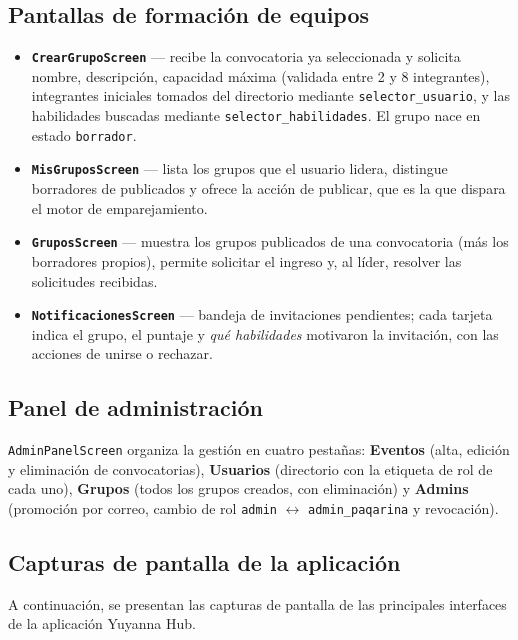 \documentclass[12pt,a4paper]{article}
\begin{document}
\subsection{Pantallas de formación de equipos}
\begin{itemize}
    \item \textbf{\texttt{CrearGrupoScreen}} --- recibe la convocatoria ya seleccionada y solicita nombre, descripción, capacidad máxima (validada entre 2 y 8 integrantes), integrantes iniciales tomados del directorio mediante \texttt{selector\_usuario}, y las habilidades buscadas mediante \texttt{selector\_habilidades}. El grupo nace en estado \texttt{borrador}.
    \item \textbf{\texttt{MisGruposScreen}} --- lista los grupos que el usuario lidera, distingue borradores de publicados y ofrece la acción de publicar, que es la que dispara el motor de emparejamiento.
    \item \textbf{\texttt{GruposScreen}} --- muestra los grupos publicados de una convocatoria (más los borradores propios), permite solicitar el ingreso y, al líder, resolver las solicitudes recibidas.
    \item \textbf{\texttt{NotificacionesScreen}} --- bandeja de invitaciones pendientes; cada tarjeta indica el grupo, el puntaje y \emph{qué habilidades} motivaron la invitación, con las acciones de unirse o rechazar.
\end{itemize}

\subsection{Panel de administración}
\texttt{AdminPanelScreen} organiza la gestión en cuatro pestañas: \textbf{Eventos} (alta, edición y eliminación de convocatorias), \textbf{Usuarios} (directorio con la etiqueta de rol de cada uno), \textbf{Grupos} (todos los grupos creados, con eliminación) y \textbf{Admins} (promoción por correo, cambio de rol \texttt{admin} $\leftrightarrow$ \texttt{admin\_paqarina} y revocación).

\subsection{Capturas de pantalla de la aplicación}

A continuación, se presentan las capturas de pantalla de las principales interfaces de la aplicación Yuyanna Hub.
\end{document}
